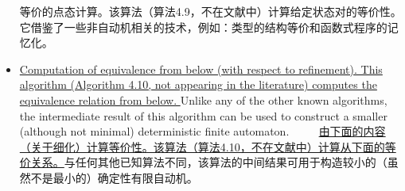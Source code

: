 \begin{itemize}
    等价的点态计算。该算法（算法4.9，不在文献中）计算给定状态对的等价性。它借鉴了一些非自动机相关的技术，例如：类型的结构等价和函数式程序的记忆化。

    \item \uline{Computation of equivalence from below (with respect to refinement). This algorithm (Algorithm 4.10, not appearing in the literature) computes the equivalence relation from below. } Unlike any of the other known algorithms, the intermediate result of this algorithm can be used to construct a smaller (although not minimal) deterministic finite automaton.
　　\newline
    \uline{由下面的内容（关于细化）计算等价性。该算法（算法4.10，不在文献中）计算从下面的等价关系。}与任何其他已知算法不同，该算法的中间结果可用于构造较小的（虽然不是最小的）确定性有限自动机。

\end{itemize}